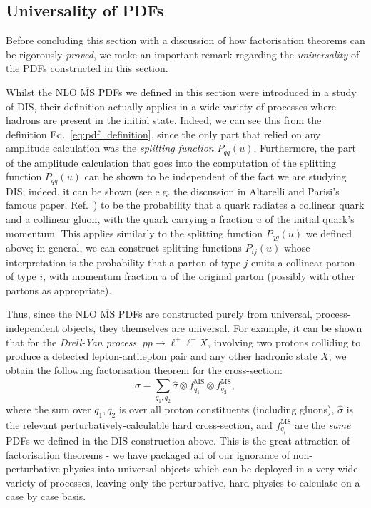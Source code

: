 \documentclass[withindex,glossary]{cam-thesis}
\begin{document}
\subsection{Universality of PDFs}
Before concluding this section with a discussion of how factorisation theorems can be rigorously \textit{proved}, we make an important remark regarding the \textit{universality} of the PDFs constructed in this section. 

Whilst the NLO $\overline{\text{MS}}$ PDFs we defined in this section were introduced in a study of DIS, their definition actually applies in a wide variety of processes where hadrons are present in the initial state. Indeed, we can see this from the definition Eq.~\eqref{eq:pdf_definition}, since the only part that relied on any amplitude calculation was the \textit{splitting function} $P_{qq}(u)$. Furthermore, the part of the amplitude calculation that goes into the computation of the splitting function $P_{qq}(u)$ can be shown to be independent of the fact we are studying DIS; indeed, it can be shown (see e.g. the discussion in Altarelli and Parisi's famous paper, Ref.~\cite{Altarelli:1977zs}) to be the probability that a quark radiates a collinear quark and a collinear gluon, with the quark carrying a fraction $u$ of the initial quark's momentum. This applies similarly to the splitting function $P_{qg}(u)$ we defined above; in general, we can construct splitting functions $P_{ij}(u)$ whose interpretation is the probability that a parton of type $j$ emits a collinear parton of type $i$, with momentum fraction $u$ of the original parton (possibly with other partons as appropriate).

Thus, since the NLO $\overline{\text{MS}}$ PDFs are constructed purely from universal, process-independent objects, they themselves are universal. For example, it can be shown that for the \textit{Drell-Yan process}, $pp \rightarrow \ell^+ \ell^- X$, involving two protons colliding to produce a detected lepton-antilepton pair and any other hadronic state $X$, we obtain the following factorisation theorem for the cross-section:
\begin{equation}
\sigma = \sum_{q_1, q_2} \hat{\sigma} \otimes f_{q_1}^{\overline{\text{MS}}} \otimes f_{q_2}^{\overline{\text{MS}}},
\end{equation} 
where the sum over $q_1, q_2$ is over all proton constituents (including gluons), $\hat{\sigma}$ is the relevant perturbatively-calculable hard cross-section, and $f_{q_i}^{\overline{\text{MS}}}$ are the \textit{same} PDFs we defined in the DIS construction above. This is the great attraction of factorisation theorems - we have packaged all of our ignorance of non-perturbative physics into universal objects which can be deployed in a very wide variety of processes, leaving only the perturbative, hard physics to calculate on a case by case basis.
\end{document}
